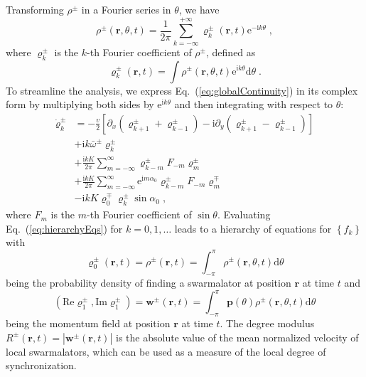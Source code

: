 \documentclass{article}
\begin{document}
Transforming $\rho^{\pm}$ in a Fourier series in $\theta$, we have 
\begin{equation}
    \rho ^{\pm}\left( \mathbf{r},\theta ,t \right) =\frac{1}{2\pi}\sum_{k=-\infty}^{+\infty}{\varrho _{k}^{\pm}\left( \mathbf{r},t \right)}\mathrm{e}^{-\mathrm{i}k\theta}\;,
\end{equation}
where $\varrho _{k}^{\pm}$ is the $k$-th Fourier coefficient of $\rho^{\pm}$, defined as
\begin{equation}
    \varrho _{k}^{\pm}\left( \mathbf{r},t \right) =\int{\rho ^{\pm}\left( \mathbf{r},\theta ,t \right) \text{e}^{\text{i}k\theta}\text{d}\theta}\;.
\end{equation}
To streamline the analysis, we express Eq.~(\ref{eq:globalContinuity}) in its complex form by multiplying both sides by $\mathrm{e}^{\mathrm{i}k\theta}$ and then integrating with respect to $\theta$:
\begin{equation}
    \label{eq:hierarchyEqs}
    \begin{aligned}
        \dot{\varrho}_{k}^{\pm}&=-\frac{v}{2}\left[ \partial _x\left( \varrho _{k+1}^{\pm}+\varrho _{k-1}^{\pm} \right) -\mathrm{i}\partial _y\left( \varrho _{k+1}^{\pm}-\varrho _{k-1}^{\pm} \right) \right]\\
        &+\mathrm{i}k\bar{\omega}^{\pm}\varrho _{k}^{\pm}\\
        &+\frac{\mathrm{i}kK}{2\pi}\sum_{m=-\infty}^{\infty}{\varrho _{k-m}^{\pm}F_{-m}\varrho _{m}^{\pm}}\\
        &+\frac{\mathrm{i}kK}{2\pi}\sum_{m=-\infty}^{\infty}{\mathrm{e}^{\mathrm{i}m\alpha _0}\varrho _{k-m}^{\pm}F_{-m}\varrho _{m}^{\mp}}\\
        &-\mathrm{i}kK\varrho _{0}^{\mp}\varrho _{k}^{\pm}\sin \alpha _0\;,
    \end{aligned}
\end{equation}
where $F_m$ is the $m$-th Fourier coefficient of $\sin \theta$. Evaluating Eq.~(\ref{eq:hierarchyEqs}) for $k=0, 1, \dots$ leads to a hierarchy of equations for $\left\{f_k\right\}$ with 
\begin{equation}
    \varrho_0^{\pm}\left(\mathbf{r}, t\right) = \rho^{\pm} \left(\mathbf{r}, t\right)=\int_{-\pi}^{\pi}{\rho^{\pm}\left(\mathbf{r}, \theta, t\right)\mathrm{d}\theta}
\end{equation}
being the probability density of finding a swarmalator at position $\mathbf{r}$ at time $t$ and 
\begin{equation}
    \left( \mathrm{Re}\varrho _1^{\pm},\mathrm{Im}\varrho _1^{\pm} \right) =\mathbf{w}^{\pm}\left( \mathbf{r},t \right) =\int_{-\pi}^{\pi}{\mathbf{p}\left( \theta \right) \rho^{\pm} \left( \mathbf{r},\theta ,t \right) \mathrm{d}\theta}
\end{equation}
being the momentum field at position $\mathbf{r}$ at time $t$.
The degree modulus $R^{\pm}\left( \mathbf{r},t \right) =\left| \mathbf{w}^{\pm}\left( \mathbf{r},t \right) \right|$ is the absolute value of the mean normalized velocity of local swarmalators, which can be used as a measure of the local degree of synchronization. 
\end{document}
